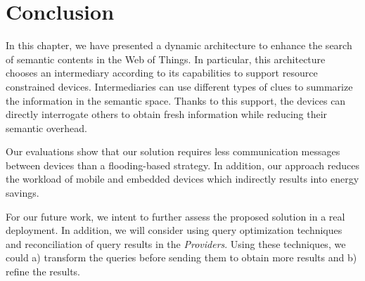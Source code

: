 \section{Conclusion}
\label{conclusion}

In this chapter, we have presented a dynamic architecture to enhance the search of semantic contents in the Web of Things.
In particular, this architecture chooses an intermediary according to its capabilities to support resource constrained devices.
Intermediaries can use different types of clues to summarize the information in the semantic space.
Thanks to this support, the devices can directly interrogate others to obtain fresh information while reducing their semantic overhead.

Our evaluations show that our solution requires less communication messages between devices than a flooding-based strategy.
In addition, our approach reduces the workload of mobile and embedded devices which indirectly results into energy savings.

For our future work, we intent to further assess the proposed solution in a real deployment.
In addition, we will consider using query optimization techniques and reconciliation of query results \citep{BakhtouchiBJA12} in the \emph{Providers}.
Using these techniques, we could a) transform the queries before sending them to obtain more results
and b) refine the results.